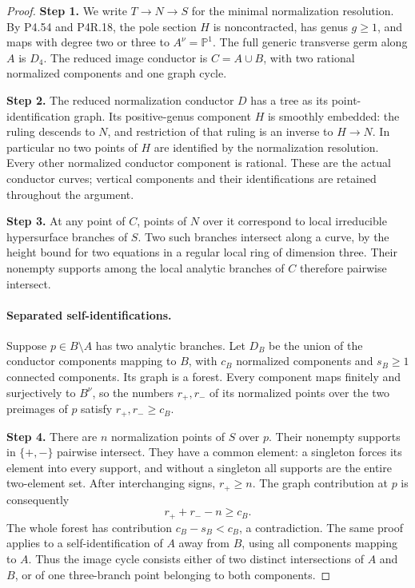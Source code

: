 \begin{proof}
\noindent\textbf{Step 1.} We write $T\to N\to S$ for the minimal normalization
resolution. By P4.54 and P4R.18, the pole section $H$ is
noncontracted, has genus $g\ge1$, and maps with degree two
or three to $A^\nu=\mathbb P^1$. The full generic transverse
germ along $A$ is $D_4$. The reduced image conductor is
$C=A\cup B$, with two rational normalized components and
one graph cycle.

\noindent\textbf{Step 2.} The reduced normalization conductor $D$ has a tree as its
point-identification graph. Its positive-genus component
$H$ is smoothly embedded: the ruling descends to $N$, and
restriction of that ruling is an inverse to $H\to N$.
In particular no two points of $H$ are identified by the
normalization resolution. Every other normalized conductor
component is rational. These are the actual conductor
curves; vertical components and their identifications are
retained throughout the argument.

\noindent\textbf{Step 3.} At any point of $C$, points of $N$ over it correspond to
local irreducible hypersurface branches of $S$. Two such
branches intersect along a curve, by the height bound for
two equations in a regular local ring of dimension three.
Their nonempty supports among the local analytic branches
of $C$ therefore pairwise intersect.

\paragraph{Separated self-identifications.}
Suppose $p\in B\setminus A$ has two analytic branches.
Let $D_B$ be the union of the conductor components mapping
to $B$, with $c_B$ normalized components and $s_B\ge1$
connected components. Its graph is a forest. Every component
maps finitely and surjectively to $B^\nu$, so the numbers
$r_+,r_-$ of its normalized points over the two preimages
of $p$ satisfy $r_+,r_-\ge c_B$.

\noindent\textbf{Step 4.} There are $n$ normalization points of $S$ over $p$.
Their nonempty supports in $\{+,-\}$ pairwise intersect.
They have a common element: a singleton forces its element
into every support, and without a singleton all supports
are the entire two-element set. After interchanging signs,
$r_+\ge n$. The graph contribution at $p$ is consequently
\[
                  r_++r_--n\ge c_B.
\]
The whole forest has contribution $c_B-s_B<c_B$, a
contradiction. The same proof applies to a self-identification
of $A$ away from $B$, using all components mapping to $A$.
Thus the image cycle consists either of two distinct
intersections of $A$ and $B$, or of one three-branch point
belonging to both components.


\end{proof}
